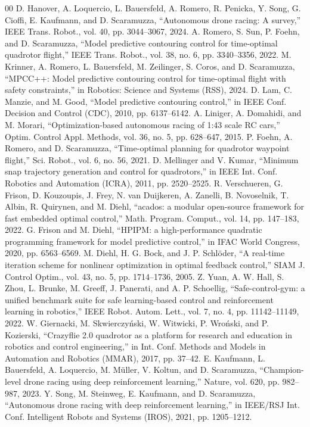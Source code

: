 \documentclass[conference]{IEEEtran}
\begin{document}
\begin{thebibliography}{00}
 D. Hanover, A. Loquercio, L. Bauersfeld, A. Romero, R. Penicka, Y. Song, G. Cioffi, E. Kaufmann, and D. Scaramuzza, ``Autonomous drone racing: A survey,'' IEEE Trans. Robot., vol. 40, pp. 3044--3067, 2024.
 A. Romero, S. Sun, P. Foehn, and D. Scaramuzza, ``Model predictive contouring control for time-optimal quadrotor flight,'' IEEE Trans. Robot., vol. 38, no. 6, pp. 3340--3356, 2022.
 M. Krinner, A. Romero, L. Bauersfeld, M. Zeilinger, S. Coros, and D. Scaramuzza, ``MPCC++: Model predictive contouring control for time-optimal flight with safety constraints,'' in Robotics: Science and Systems (RSS), 2024.
 D. Lam, C. Manzie, and M. Good, ``Model predictive contouring control,'' in IEEE Conf. Decision and Control (CDC), 2010, pp. 6137--6142.
 A. Liniger, A. Domahidi, and M. Morari, ``Optimization-based autonomous racing of 1:43 scale RC cars,'' Optim. Control Appl. Methods, vol. 36, no. 5, pp. 628--647, 2015.
 P. Foehn, A. Romero, and D. Scaramuzza, ``Time-optimal planning for quadrotor waypoint flight,'' Sci. Robot., vol. 6, no. 56, 2021.
 D. Mellinger and V. Kumar, ``Minimum snap trajectory generation and control for quadrotors,'' in IEEE Int. Conf. Robotics and Automation (ICRA), 2011, pp. 2520--2525.
 R. Verschueren, G. Frison, D. Kouzoupis, J. Frey, N. van Duijkeren, A. Zanelli, B. Novoselnik, T. Albin, R. Quirynen, and M. Diehl, ``acados: a modular open-source framework for fast embedded optimal control,'' Math. Program. Comput., vol. 14, pp. 147--183, 2022.
 G. Frison and M. Diehl, ``HPIPM: a high-performance quadratic programming framework for model predictive control,'' in IFAC World Congress, 2020, pp. 6563--6569.
 M. Diehl, H. G. Bock, and J. P. Schl\"oder, ``A real-time iteration scheme for nonlinear optimization in optimal feedback control,'' SIAM J. Control Optim., vol. 43, no. 5, pp. 1714--1736, 2005.
 Z. Yuan, A. W. Hall, S. Zhou, L. Brunke, M. Greeff, J. Panerati, and A. P. Schoellig, ``Safe-control-gym: a unified benchmark suite for safe learning-based control and reinforcement learning in robotics,'' IEEE Robot. Autom. Lett., vol. 7, no. 4, pp. 11142--11149, 2022.
 W. Giernacki, M. Skwierczy\'nski, W. Witwicki, P. Wro\'nski, and P. Kozierski, ``Crazyflie 2.0 quadrotor as a platform for research and education in robotics and control engineering,'' in Int. Conf. Methods and Models in Automation and Robotics (MMAR), 2017, pp. 37--42.
 E. Kaufmann, L. Bauersfeld, A. Loquercio, M. M\"uller, V. Koltun, and D. Scaramuzza, ``Champion-level drone racing using deep reinforcement learning,'' Nature, vol. 620, pp. 982--987, 2023.
 Y. Song, M. Steinweg, E. Kaufmann, and D. Scaramuzza, ``Autonomous drone racing with deep reinforcement learning,'' in IEEE/RSJ Int. Conf. Intelligent Robots and Systems (IROS), 2021, pp. 1205--1212.
\end{thebibliography}
\end{document}
